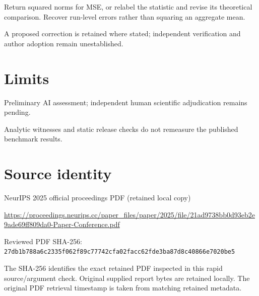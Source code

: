 \documentclass[11pt]{article}
\begin{document}
Return squared norms for MSE, or relabel the statistic and revise its theoretical comparison. Recover run-level errors rather than squaring an aggregate mean.

A proposed correction is retained where stated; independent verification and author adoption remain unestablished.

\section*{Limits}

Preliminary AI assessment; independent human scientific adjudication remains pending.\par

Analytic witnesses and static release checks do not remeasure the published benchmark results.\par

\section*{Source identity}

NeurIPS 2025 official proceedings PDF (retained local copy)

\url{https://proceedings.neurips.cc/paper_files/paper/2025/file/21ad9738bb0d93eb2e9ade69ff809da0-Paper-Conference.pdf}

Reviewed PDF SHA-256: \nolinkurl{27db1b788a6c2335f062f89c77742cfa02facc62fde3ba87d8c40866e7020be5}

The SHA-256 identifies the exact retained PDF inspected in this rapid source/argument check. Original supplied report bytes are retained locally. The original PDF retrieval timestamp is taken from matching retained metadata.
\end{document}
